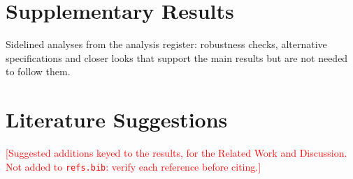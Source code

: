 \documentclass[10pt]{article}
\theoremstyle{definition}
\newcommand{\todo}[1]{\textcolor{red}{[#1]}}
\begin{document}
\clearpage
\section{Supplementary Results}\label{app:supplement}

Sidelined analyses from the analysis register: robustness checks, alternative specifications and closer looks that
support the main results but are not needed to follow them.



\clearpage
\section{Literature Suggestions}\label{app:lit}

\todo{Suggested additions keyed to the results, for the Related Work and Discussion. Not added to \texttt{refs.bib}:
verify each reference before citing.}
\end{document}
